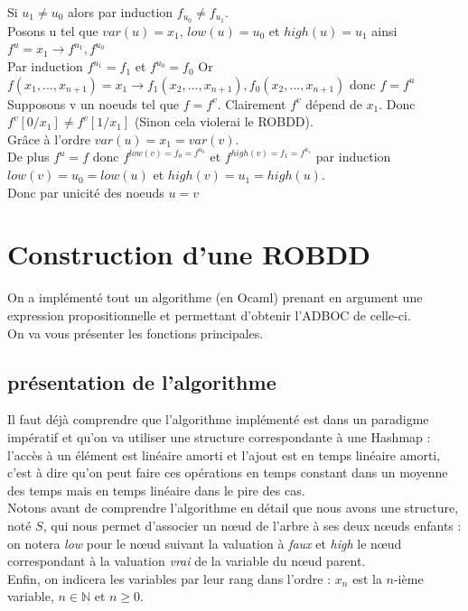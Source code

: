 \documentclass[a4paper, oneside]{report}
\begin{document}
Si $u_1 \neq u_0$ alors par induction $f_{u_0} \neq f_{u_1}$.\\
Posons u tel que $var(u) = x_1$, $low(u) = u_0$ et $high(u) = u_1$ ainsi $f^u = x_1 \rightarrow f^{u_1}, f^{u_0}$\\
Par induction $f^{u_1} = f_1$ et $f^{u_0} = f_0$ Or $f(x_1,...,x_{n+1}) = x_1 \rightarrow f_1(x_2,...,x_{n+1}), f_0(x_2,...,x_{n+1})$ donc $f = f^u$ \\
Supposons v un noeuds tel que $f = f^v$. Clairement $f^v$ dépend de $x_1$. Donc $f^v[0/x_1] \neq f^v[1/x_1]$ (Sinon cela violerai le ROBDD).\\
Grâce à l'ordre $var(u) = x_1 = var(v)$.\\
De plus $f^u = f$ donc $f^{low(v) = f_0 = f^{u_0}}$ et $f^{high(v) = f_1 = f^{u_1}}$ par induction $low(v) = u_0 = low(u)$ et $high(v) = u_1 = high(u)$.\\
Donc par unicité des noeuds $u = v$


\chapter{Construction d'une ROBDD}

On a implémenté tout un algorithme (en Ocaml) prenant en argument une expression propositionnelle et permettant d'obtenir l'ADBOC de celle-ci.\\
On va vous présenter les fonctions principales.

\section{présentation de l'algorithme}

Il faut déjà comprendre que l'algorithme implémenté est dans un paradigme impératif et qu'on va utiliser une structure correspondante à une Hashmap : l'accès à un élément est linéaire amorti et l'ajout est en temps linéaire amorti, c'est à dire qu'on peut faire ces opérations en temps constant dans un moyenne des temps mais en temps linéaire dans le pire des cas.\\
Notons avant de comprendre l'algorithme en détail que nous avons une structure, noté $S$, qui nous permet d'associer un nœud de l'arbre à ses deux nœuds enfants : on notera \textit{low} pour le nœud suivant la valuation à \textit{faux} et \textit{high} le nœud correspondant à la valuation \textit{vrai} de la variable du nœud parent.\\
Enfin, on indicera les variables par leur rang dans l'ordre : $x_n$ est la $n$-ième variable, $n\in \mathbb{N}$ et $n\geq 0$.\\
\end{document}
